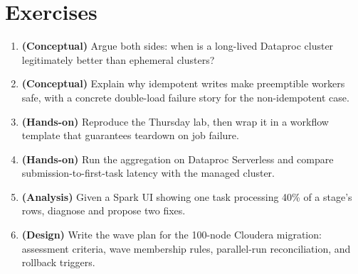 \section{Exercises}
\begin{enumerate}
    \item \textbf{(Conceptual)} Argue both sides: when is a long-lived Dataproc cluster legitimately better than ephemeral clusters?
    \item \textbf{(Conceptual)} Explain why idempotent writes make preemptible workers safe, with a concrete double-load failure story for the non-idempotent case.
    \item \textbf{(Hands-on)} Reproduce the Thursday lab, then wrap it in a workflow template that guarantees teardown on job failure.
    \item \textbf{(Hands-on)} Run the aggregation on Dataproc Serverless and compare submission-to-first-task latency with the managed cluster.
    \item \textbf{(Analysis)} Given a Spark UI showing one task processing 40\% of a stage's rows, diagnose and propose two fixes.
    \item \textbf{(Design)} Write the wave plan for the 100-node Cloudera migration: assessment criteria, wave membership rules, parallel-run reconciliation, and rollback triggers.
\end{enumerate}

